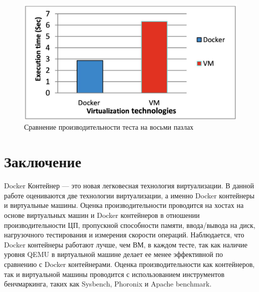 \documentclass{mirea}
\begin{document}
	\begin{figure}[H]
		\centering
		\includegraphics[width=.6\textwidth]{img10}
		\parskip=6pt
		\caption{Сравнение производительности теста на восьми пазлах}
		\label{fig:pic10}
	\end{figure}

	\section{Заключение}
	
	Docker Контейнер — это новая легковесная технология виртуализации. В данной работе оцениваются две технологии виртуализации, а именно Docker контейнеры и виртуальные машины. Оценка производительности проводится на хостах на основе виртуальных машин и Docker контейнеров в отношении производительности ЦП, пропускной способности памяти, ввода/вывода на диск, нагрузочного тестирования и измерения скорости операций. Наблюдается, что Docker контейнеры работают лучше, чем ВМ, в каждом тесте, так как наличие уровня QEMU в виртуальной машине делает ее менее эффективной по сравнению с Docker контейнерами. Оценка производительности как контейнеров, так и виртуальной машины проводится с использованием инструментов бенчмаркинга, таких как Sysbench, Phoronix и Apache benchmark.

	
	
\end{document}
